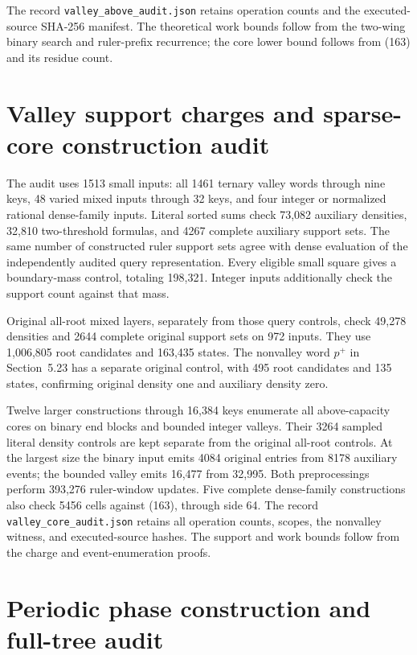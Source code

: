 \documentclass[11pt]{article}
\begin{document}
The record \texttt{valley\_above\_audit.json} retains operation counts and
the executed-source SHA-256 manifest. The theoretical work bounds follow
from the two-wing binary search and ruler-prefix recurrence; the core
lower bound follows from (163) and its residue count.

\clearpage
\section{Valley support charges and sparse-core construction audit}
\label{app:valley-core-audit}
The audit uses 1513 small inputs: all 1461 ternary valley words through
nine keys, 48 varied mixed inputs through 32 keys, and four integer or
normalized rational dense-family inputs. Literal sorted sums check 73,082
auxiliary densities, 32,810 two-threshold formulas, and 4267 complete
auxiliary support sets. The same number of constructed ruler support sets
agree with dense evaluation of the independently audited query representation.
Every eligible small square gives a boundary-mass control, totaling 198,321.
Integer inputs additionally check the support count against that mass.

Original all-root mixed layers, separately from those query controls, check
49,278 densities and 2644 complete original support sets on 972 inputs.
They use 1,006,805 root candidates and 163,435 states. The nonvalley word
$p^+$ in Section~5.23 has a separate original
control, with 495 root candidates and 135 states, confirming original
density one and auxiliary density zero.

Twelve larger constructions through 16,384 keys enumerate all above-capacity
cores on binary end blocks and bounded integer valleys. Their 3264 sampled
literal density controls are kept separate from the original all-root
controls. At the largest size the binary input emits 4084 original entries
from 8178 auxiliary events; the bounded valley emits 16,477 from 32,995.
Both preprocessings perform 393,276 ruler-window updates. Five complete
dense-family constructions also check 5456 cells
against (163), through side 64. The record
\texttt{valley\_core\_audit.json} retains all operation counts, scopes,
the nonvalley witness, and executed-source hashes. The support and work
bounds follow from the charge and event-enumeration proofs.

\clearpage
\section{Periodic phase construction and full-tree audit}
\label{app:periodic-obst}
\end{document}
